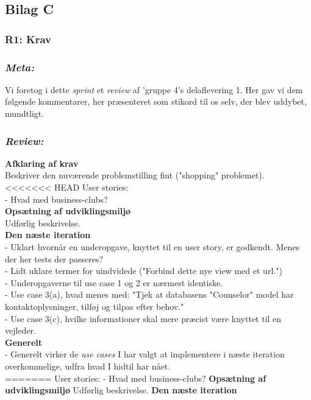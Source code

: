 \documentclass[12pt]{article}
\begin{document}
\subsection{Bilag C}
\label{sec:bilagC}
\subsubsection{R1: Krav}

\subsubsection*{\textit{Meta:}}
Vi foretog i dette \textit{sprint} et \textit{review} af 'gruppe 4's delaflevering 1. Her gav vi dem følgende kommentarer, her præsenteret som stikord til os selv, der blev uddybet, mundtligt.

\subsubsection*{\textit{Review:}} 
\textbf{Afklaring af krav} \\
Beskriver den nuværende problemstilling fint ("shopping" problemet).
<<<<<<< HEAD
User stories: \\
- Hvad med business-clubs?\\
\textbf{Opsætning af udviklingsmiljø} \\
Udførlig beskrivelse.\\
\textbf{Den næste iteration} \\
- Uklart hvornår en underopgave, knyttet til en user story, er godkendt. Menes der her tests der passeres? \\
- Lidt uklare termer for uindvidede ("Forbind dette nye view med et url.") \\
- Underopgaverne til use case 1 og 2 er nærmest identiske. \\
- Use case 3(a), hvad menes med: "Tjek at databasens "Counselor" model har \\ kontaktoplysninger, tilføj og tilpas efter behov." \\
- Use case 3(c), hvilke informationer skal mere præcist være knyttet til en vejleder.\\
\textbf{Generelt} \\
- Generelt virker de \textit{use cases} I har valgt at implementere i næste iteration overkommelige, udfra hvad I hidtil har nået. \\
=======
User stories:
- Hvad med business-clubs?
\textbf{Opsætning af udviklingsmiljø}
Udførlig beskrivelse.
\textbf{Den næste iteration}
\end{document}
